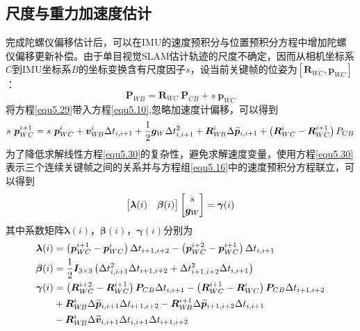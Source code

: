 \subsection{尺度与重力加速度估计}
完成陀螺仪偏移估计后，可以在IMU的速度预积分与位置预积分方程中增加陀螺仪偏移更新补偿。由于单目视觉SLAM估计轨迹的尺度不确定，因而从相机坐标系$C$到IMU坐标系$B$的坐标变换含有尺度因子$s$，设当前关键帧的位姿为$[\boldsymbol{R}_{WC},\boldsymbol{p}_{WC}]$：
\begin{equation}
\label{equ5.29}
\boldsymbol{P}_{W\!B} = \boldsymbol{R}_{WC}\ \boldsymbol{P}_{CB} + s\ \boldsymbol{p}_{WC} 
\end{equation}
将方程\eqref{equ5.29}带入方程\eqref{equ5.10},忽略加速度计偏移，可以得到
\begin{equation}
\label{equ5.30}
s\ \boldsymbol{p}_{WC}^{i+1} = s\ \boldsymbol{p}_{WC}^i + \boldsymbol{v}_{W\!B}^i \Delta t_{i,i+1}+{1 \over 2} \boldsymbol{g}_W \Delta t_{i,i+1}^2 + \boldsymbol{R}_{W\!B}^i \Delta  \widetilde{\boldsymbol{p}}_{i,i+1} + \left(\boldsymbol{R}_{WC}^i-\boldsymbol{R}_{WC}^{i+1} \right) P_{CB}
\end{equation}
为了降低求解线性方程\eqref{equ5.30}的复杂性，避免求解速度变量，使用方程\eqref{equ5.30}表示三个连续关键帧之间的关系并与方程组\eqref{equ5.16}中的速度预积分方程联立，可以得到
\begin{equation}
\label{equ5.31} 
\begin{bmatrix}
\boldsymbol{\lambda}(i) & \boldsymbol{\beta}(i) \cr 
\end{bmatrix} 
\begin{bmatrix}
s \cr
\boldsymbol{g}_W \cr
\end{bmatrix}
= \boldsymbol{\gamma}(i)
\end{equation}
其中系数矩阵$\boldsymbol{\lambda}(i)$，$\boldsymbol{\beta}(i)$，$\boldsymbol{\gamma} (i)$分别为
\begin{equation}
\label{equ5.32}
\begin{aligned}
\boldsymbol{\lambda}(i) &= \left( \boldsymbol{p}_{WC}^{i+1}-\boldsymbol{p}_{WC}^i \right) \Delta t_{i+1,i+2} - \left( \boldsymbol{p}_{WC}^{i+2}-\boldsymbol{p}_{WC}^{i+1} \right)\Delta t_{i,i+1} 
\\ 
\boldsymbol{\beta} (i) &= {1 \over 2} \boldsymbol{I}_{3 \times 3} \left( \Delta t_{i,i+1}^2 \Delta t_{i+1,i+2} + \Delta t_{i+1,i+2}^2 \Delta t_{i,i+1} \right) 
\\ 
\boldsymbol{\gamma} (i) &=  \left( \boldsymbol{R}_{WC}^{i+2} - \boldsymbol{R}_{WC}^{i+1} \right) \boldsymbol{P}_{CB} \Delta t_{i,i+1} - \left( \boldsymbol{R}_{WC}^{i+1} - \boldsymbol{R}_{WC}^{i} \right) \boldsymbol{P}_{CB} \Delta t_{i+1,i+2}  \\ 
& + \boldsymbol{R}_{W\!B}^{i} \Delta \widetilde{\boldsymbol{p}}_{i,i+1} \Delta t_{i+1,i+2} - \boldsymbol{R}_{W\!B}^{i+1} \Delta \widetilde{\boldsymbol{p}}_{i+1,i+2} \Delta t_{i,i+1} 			
\\
& - \boldsymbol{R}_{W\!B}^{i} \Delta \widetilde{\boldsymbol{v}}_{i,i+1} \Delta t_{i,i+1} \Delta t_{i+1,i+2}
\end{aligned}
\end{equation}
